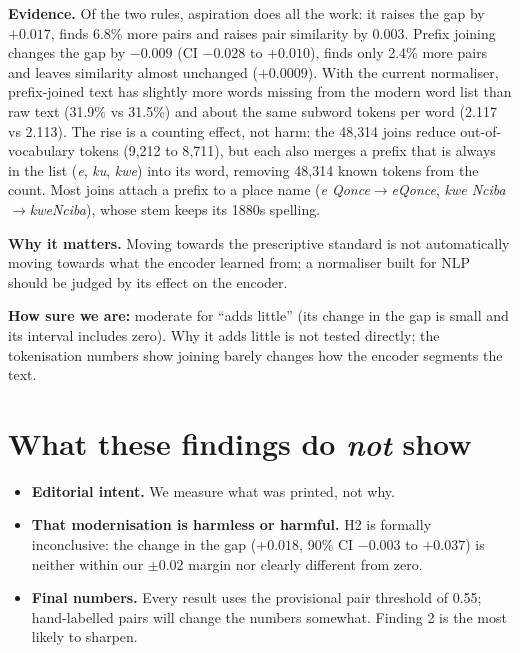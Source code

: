 \documentclass[11pt,a4paper]{article}
\newcommand{\strength}[1]{\par\noindent\textbf{How sure we are:} #1\par}
\begin{document}
\textbf{Evidence.} Of the two rules, aspiration does all the work: it raises the gap by $+0.017$, finds
6.8\% more pairs and raises pair similarity by 0.003. Prefix joining changes the gap by $-0.009$ (CI
$-0.028$ to $+0.010$), finds only 2.4\% more pairs and leaves similarity almost unchanged ($+0.0009$). With the current normaliser,
prefix-joined text has slightly more words missing from the modern word list than raw text (31.9\% vs
31.5\%) and about the same subword tokens per word (2.117 vs 2.113). The rise is a counting effect, not
harm: the 48{,}314 joins reduce out-of-vocabulary tokens (9{,}212 to 8{,}711), but each also merges a
prefix that is always in the list (\emph{e}, \emph{ku}, \emph{kwe}) into its word, removing 48{,}314 known
tokens from the count. Most joins attach a prefix to a place name (\emph{e Qonce}$\to$\emph{eQonce},
\emph{kwe Nciba}$\to$\emph{kweNciba}), whose stem keeps its 1880s spelling.

\textbf{Why it matters.} Moving towards the prescriptive standard is not automatically moving towards
what the encoder learned from; a normaliser built for NLP should be judged by its effect on the encoder.

\strength{moderate for ``adds little'' (its change in the gap is small and its interval includes zero). Why
it adds little is not tested directly; the tokenisation numbers show joining barely changes how the
encoder segments the text.}

\section*{What these findings do \emph{not} show}
\begin{itemize}
  \item \textbf{Editorial intent.} We measure what was printed, not why.
  \item \textbf{That modernisation is harmless or harmful.} H2 is formally inconclusive: the change in the
  gap ($+0.018$, 90\% CI $-0.003$ to $+0.037$) is neither within our $\pm$0.02 margin nor clearly
  different from zero.
  \item \textbf{Final numbers.} Every result uses the provisional pair threshold of 0.55; hand-labelled pairs
  will change the numbers somewhat. Finding 2 is the most likely to sharpen.
\end{itemize}
\end{document}
